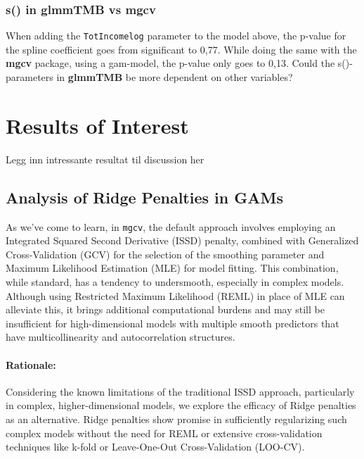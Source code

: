 \documentclass[12pt, twoside,hidelinks]{article}
\theoremstyle{definition}
\numberwithin{equation}{section}
\begin{document}
\subsubsection{s() in \textbf{glmmTMB} vs \textbf{mgcv}}
When adding the \texttt{TotIncomelog} parameter to the model above, the p-value for the spline coefficient goes from significant to 0,77.
While doing the same with the \textbf{mgcv} package, using a gam-model, the p-value only goes to 0,13. Could the s()-parameters in \textbf{glmmTMB} be more dependent on other variables?







\section{Results of Interest}

Legg inn intressante resultat til discussion her 

\subsection{Analysis of Ridge Penalties in GAMs}

As we've come to learn, in \texttt{mgcv}, the default approach involves employing an Integrated Squared Second Derivative (ISSD) penalty, combined with Generalized Cross-Validation (GCV) for the selection of the smoothing parameter and Maximum Likelihood Estimation (MLE) for model fitting. This combination, while standard, has a tendency to undersmooth, especially in complex models. Although using Restricted Maximum Likelihood (REML) in place of MLE can alleviate this, it brings additional computational burdens and may still be insufficient for high-dimensional models with multiple smooth predictors that have multicollinearity and autocorrelation structures.

\paragraph{Rationale:}
Considering the known limitations of the traditional ISSD approach, particularly in complex, higher-dimensional models, we explore the efficacy of Ridge penalties as an alternative. Ridge penalties show promise in sufficiently regularizing such complex models without the need for REML or extensive cross-validation techniques like k-fold or Leave-One-Out Cross-Validation (LOO-CV).
\end{document}

